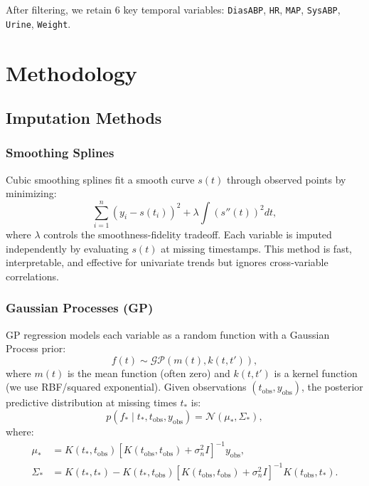 \documentclass[11pt]{article}
\begin{document}
After filtering, we retain 6 key temporal variables: \texttt{DiasABP}, \texttt{HR}, \texttt{MAP}, \texttt{SysABP}, \texttt{Urine}, \texttt{Weight}.

\section{Methodology}

\subsection{Imputation Methods}

\subsubsection{Smoothing Splines}
Cubic smoothing splines fit a smooth curve $s(t)$ through observed points by minimizing:
\begin{equation}
\sum_{i=1}^{n} (y_i - s(t_i))^2 + \lambda \int (s''(t))^2 dt,
\end{equation}
where $\lambda$ controls the smoothness-fidelity tradeoff. Each variable is imputed independently by evaluating $s(t)$ at missing timestamps. This method is fast, interpretable, and effective for univariate trends but ignores cross-variable correlations.

\subsubsection{Gaussian Processes (GP)}
GP regression models each variable as a random function with a Gaussian Process prior:
\begin{equation}
f(t) \sim \mathcal{GP}(m(t), k(t, t')),
\end{equation}
where $m(t)$ is the mean function (often zero) and $k(t,t')$ is a kernel function (we use RBF/squared exponential). Given observations $(t_{\text{obs}}, y_{\text{obs}})$, the posterior predictive distribution at missing times $t_*$ is:
\begin{equation}
p(f_* \mid t_*, t_{\text{obs}}, y_{\text{obs}}) = \mathcal{N}(\mu_*, \Sigma_*),
\end{equation}
where:
\begin{align}
\mu_* &= K(t_*, t_{\text{obs}}) [K(t_{\text{obs}}, t_{\text{obs}}) + \sigma_n^2 I]^{-1} y_{\text{obs}}, \\
\Sigma_* &= K(t_*, t_*) - K(t_*, t_{\text{obs}}) [K(t_{\text{obs}}, t_{\text{obs}}) + \sigma_n^2 I]^{-1} K(t_{\text{obs}}, t_*).
\end{align}
\end{document}
